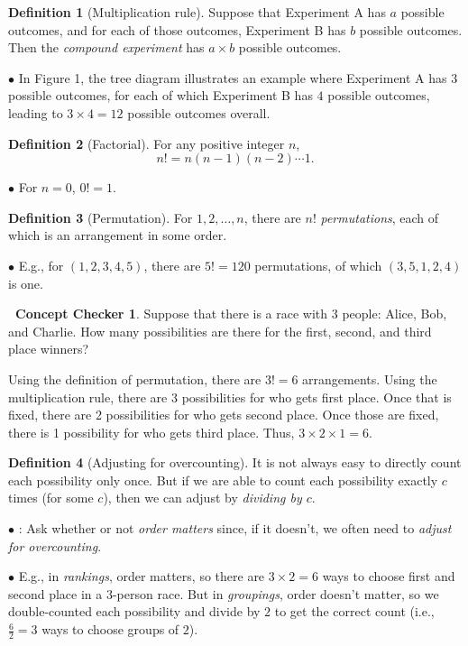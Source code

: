 \documentclass[12pt,oneside]{article}
\newcommand{\tip}{\textbf{\faLightbulb}: }
\theoremstyle{definition}
\newtheorem{definition}{Definition}
\newtheorem{concept}{\faPen \ Concept Checker}
\theoremstyle{remark}
\begin{document}
\begin{definition}[Multiplication rule]
Suppose that Experiment A has $a$ possible outcomes, and for each of those outcomes, Experiment B has $b$ possible outcomes. Then the \textit{compound experiment} has $a \times b$ possible outcomes.

$\bullet$ In Figure 1, the tree diagram illustrates an example where Experiment A has $3$ possible outcomes, for each of which Experiment B has $4$ possible outcomes, leading to $3 \times 4 = 12$ possible outcomes overall.
\end{definition}

\begin{definition}[Factorial]
For any positive integer $n$, \[n! = n(n - 1)(n - 2) \cdots 1.\]

$\bullet$ For $n = 0$, $0! = 1$.
\end{definition}

\begin{definition}[Permutation]
For $1, 2, \ldots, n$, there are $n!$ \textit{permutations}, each of which is an arrangement in some order.

$\bullet$ E.g., for $(1, 2, 3, 4, 5)$, there are $5! = 120$ permutations, of which $(3, 5, 1, 2, 4)$ is one.
\end{definition}

\begin{concept}
Suppose that there is a race with 3 people: Alice, Bob, and Charlie. How many possibilities are there for the first, second, and third place winners?
\end{concept}

\begin{solutionbox}
Using the definition of permutation, there are $3! = 6$ arrangements. Using the multiplication rule, there are 3 possibilities for who gets first place. Once that is fixed, there are 2 possibilities for who gets second place. Once those are fixed, there is 1 possibility for who gets third place. Thus, $3 \times 2 \times 1 = 6$.
\end{solutionbox}

\begin{definition}[Adjusting for overcounting]
It is not always easy to directly count each possibility only once. But if we are able to count each possibility exactly $c$ times (for some $c$), then we can adjust by \textit{dividing by $c$}.

$\bullet$ \tip Ask whether or not \textit{order matters} since, if it doesn't, we often need to \textit{adjust for overcounting}.

$\bullet$ E.g., in \textit{rankings}, order matters, so there are $3 \times 2 = 6$ ways to choose first and second place in a $3$-person race. But in \textit{groupings}, order doesn't matter, so we double-counted each possibility and divide by $2$ to get the correct count (i.e., $\frac{6}{2} = 3$ ways to choose groups of $2$).
\end{definition}
\end{document}
